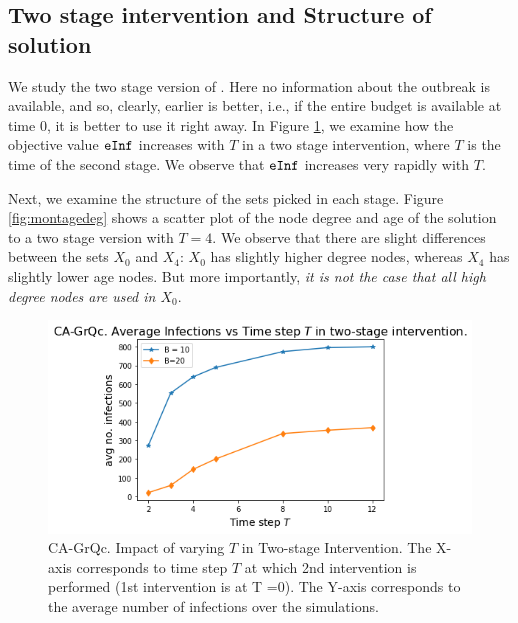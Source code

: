 \subsection{Two stage intervention and Structure of solution}
We study the two stage version of \prob{}. Here no information about the outbreak is available, and so, clearly, earlier is better, i.e., if the entire budget is available at time $0$, it is better to use it right away. In Figure \ref{fig:temporal}, we examine how the objective value $\texttt{eInf}{}$ increases with $T$ in a two stage intervention, where $T$ is the time of the second stage. We observe that $\texttt{eInf}{}$ increases very rapidly with $T$.

Next, we examine the structure of the sets picked in each stage. Figure \ref{fig:montagedeg} shows a scatter plot of the node degree and age of the solution to a two stage version with $T=4$. We observe that there are slight differences between the sets $X_0$ and $X_4$: $X_0$ has slightly higher degree nodes, whereas $X_4$ has slightly lower age nodes. But more importantly, \emph{it is not the case that all high degree nodes are used in $X_0$}.
\begin{figure}[!h]
    \centering
    \includegraphics[scale = 0.45]{figures/twostage.png}
    \caption{CA-GrQc. Impact of varying $T$ in Two-stage Intervention. The X-axis corresponds to time step $T$ at which 2nd intervention is performed (1st intervention is at T =0). The Y-axis corresponds to the average number of infections over the simulations.}
    \label{fig:temporal}
\end{figure}

